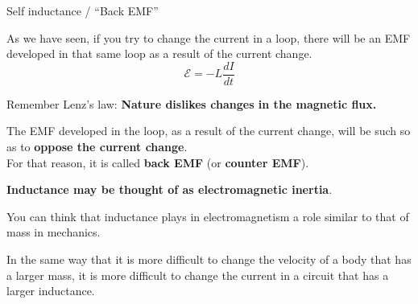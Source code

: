 %
%
%

\begin{frame}{Self inductance / ``Back EMF''}

As we have seen, if you try to change the current in a loop,
there will be an EMF developed in that same loop as a result of the current change.
\begin{equation*}
  \mathcal{E} = - L \frac{dI}{dt}
\end{equation*}

Remember Lenz's law: {\bf  Nature dislikes changes in the magnetic flux.}

\vspace{0.2cm}

The EMF developed in the loop, as a result of the current change,
will be such so as to {\bf oppose the current change}. \\
For that reason, it is called {\bf back EMF} (or {\bf counter EMF}).

\vspace{0.2cm}

{\bf Inductance  may be thought of as electromagnetic inertia}.
\begin{itemize}
{\small
  \item You can think that inductance plays in electromagnetism a role similar
            to that of mass in mechanics.
  \item In the same way that it is more difficult to change the velocity of a body
            that has a larger mass, it is more difficult to change the current in a circuit
            that has a larger inductance.
}
\end{itemize}

\end{frame}

%
%
%


